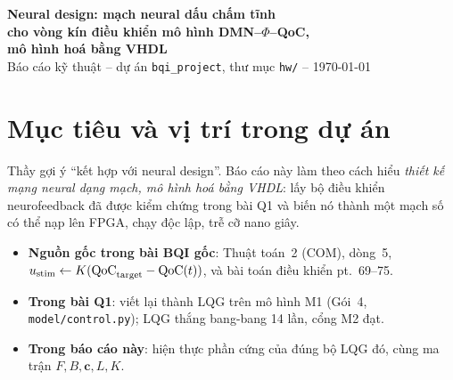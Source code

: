 \documentclass[11pt,a4paper]{article}
\newcommand{\QoC}{\mathrm{QoC}}
\newcommand{\code}[1]{\texttt{#1}}
\begin{document}
\begin{center}
{\Large\bfseries\color{hdr} Neural design: mạch neural dấu chấm tĩnh\\[3pt]
cho vòng kín điều khiển mô hình DMN--$\Phi$--QoC,\\[3pt] mô hình hoá bằng VHDL}\\[8pt]
{\small Báo cáo kỹ thuật -- dự án \code{bqi\_project}, thư mục \code{hw/} -- \today}
\end{center}

\vspace{2pt}
\noindent{}

\tableofcontents
\vspace{-4pt}

\section{Mục tiêu và vị trí trong dự án}

Thầy gợi ý ``kết hợp với neural design''. Báo cáo này làm theo cách hiểu \emph{thiết kế mạng neural dạng
mạch, mô hình hoá bằng VHDL}: lấy bộ điều khiển neurofeedback đã được kiểm chứng trong bài Q1 và biến
nó thành một mạch số có thể nạp lên FPGA, chạy độc lập, trễ cỡ nano giây.

\begin{itemize}
  \item \textbf{Nguồn gốc trong bài BQI gốc}: Thuật toán~2 (COM), dòng~5,
        $u_{\rm stim}\leftarrow K(\QoC_{\rm target}-\QoC(t))$, và bài toán điều khiển pt.~69--75.
  \item \textbf{Trong bài Q1}: viết lại thành LQG trên mô hình M1 (Gói~4, \code{model/control.py});
        LQG thắng bang-bang 14 lần, cổng M2 đạt.
  \item \textbf{Trong báo cáo này}: hiện thực phần cứng của đúng bộ LQG đó, cùng ma trận $F,B,\mathbf c,L,K$.
\end{itemize}
\end{document}
